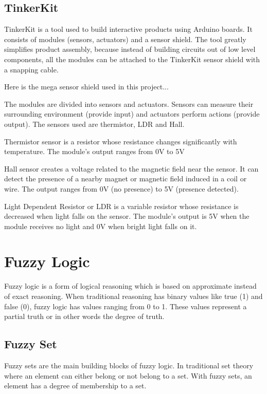 
\subsection{TinkerKit}

TinkerKit \cite{tinkerkit_introduction} is a tool used to build interactive products using Arduino boards. It consists of modules (sensors, actuators) and a sensor shield. The tool greatly simplifies product assembly, because instead of building circuits out of low level components, all the modules can be attached to the TinkerKit sensor shield with a snapping cable.

Here is the mega sensor shield used in this project...

The modules are divided into sensors and actuators. Sensors can measure their surrounding environment (provide input) and actuators perform actions (provide output). The sensors used are thermistor, LDR and Hall. 

Thermistor sensor \cite{thermistor_sensor} is a resistor whose resistance changes significantly with temperature. The module's output ranges from 0V to 5V

Hall sensor \cite{hall_sensor} creates a voltage related to the magnetic field near the sensor. It can detect the presence of a nearby magnet or magnetic field induced in a coil or wire. The output ranges from 0V (no presence) to 5V (presence detected). 

Light Dependent Resistor or LDR \cite{light_sensor} is a variable resistor whose resistance is decreased when light falls on the sensor. The module's output is 5V when the module receives no light and 0V when bright light falls on it.

\section{Fuzzy Logic}

Fuzzy logic is a form of logical reasoning which is based on approximate instead of exact reasoning. When traditional reasoning has binary values like true (1) and false (0), fuzzy logic has values ranging from 0 to 1. These values represent a partial truth or in other words the degree of truth. 

\subsection{Fuzzy Set}
Fuzzy sets are the main building blocks of fuzzy logic. In traditional set theory where an element can either belong or not belong to a set. With fuzzy sets, an element has a degree of membership to a set. 

